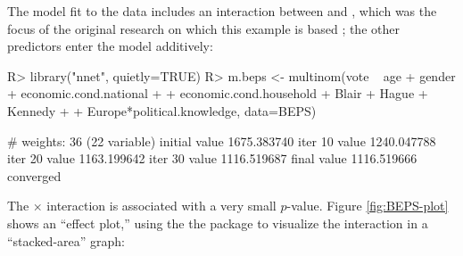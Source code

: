 \documentclass[
]{jss}
\begin{document}
The model fit to the data includes an interaction between 
and , which was the focus of the original
research on which this example is based
\citep{AndersenHeathSinnott:2002}; the other predictors enter the model
additively:

\begin{CodeChunk}
\begin{CodeInput}
R> library("nnet", quietly=TRUE)
R> m.beps <- multinom(vote ~ age + gender + economic.cond.national +
+                        economic.cond.household + Blair + Hague + Kennedy +
+                        Europe*political.knowledge, data=BEPS)
\end{CodeInput}
\begin{CodeOutput}
# weights:  36 (22 variable)
initial  value 1675.383740 
iter  10 value 1240.047788
iter  20 value 1163.199642
iter  30 value 1116.519687
final  value 1116.519666 
converged
\end{CodeOutput}
\end{CodeChunk}

The  \(\times\)  interaction is
associated with a very small \(p\)-value. Figure \ref{fig:BEPS-plot}
shows an ``effect plot,'' using the the  package
\citep{FoxWeisberg:2019} to visualize the interaction in a
``stacked-area'' graph:
\end{document}
